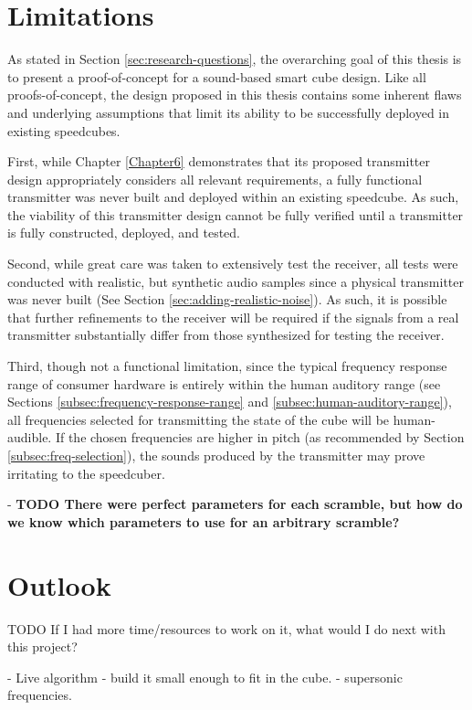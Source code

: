 \section{Limitations}
\label{sec:limitations}

As stated in Section \ref{sec:research-questions}, the overarching goal
of this thesis is to present a proof-of-concept for a sound-based smart
cube design. Like all proofs-of-concept, the design proposed in this
thesis contains some inherent flaws and underlying assumptions that limit
its ability to be successfully deployed in existing speedcubes.

First, while Chapter \ref{Chapter6} demonstrates that its proposed
transmitter design appropriately considers all relevant requirements, a
fully functional transmitter was never built and deployed within an
existing speedcube. As such, the viability of this transmitter design
cannot be fully verified until a transmitter is fully constructed,
deployed, and tested.

Second, while great care was taken to extensively test the receiver,
all tests were conducted with realistic, but synthetic audio samples
since a physical transmitter was never built (See Section
\ref{sec:adding-realistic-noise}). As such, it is possible that further
refinements to the receiver will be required if the signals from a real
transmitter substantially differ from those synthesized for testing the
receiver.

Third, though not a functional limitation, since the typical frequency
response range of consumer hardware is entirely within the human
auditory range (see Sections \ref{subsec:frequency-response-range} and
\ref{subsec:human-auditory-range}), all frequencies selected for
transmitting the state of the cube will be human-audible. If the chosen
frequencies are higher in pitch (as recommended by Section
\ref{subsec:freq-selection}), the sounds produced by the transmitter
may prove irritating to the speedcuber. 

- \textbf{TODO There were perfect parameters for each scramble, but how do we know which parameters to use for an arbitrary scramble?}


\section{Outlook}
\label{sec:outlook}
TODO If I had more time/resources to work on it, what would I do next
with this project?

- Live algorithm
- build it small enough to fit in the cube.
- supersonic frequencies.
